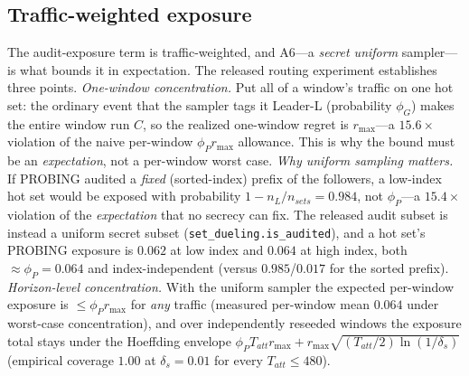 \documentclass{article}
\newcommand{\rmax}{r_{\max}}
\begin{document}
\subsection{Traffic-weighted exposure}\label{sec:eval-floortraffic}
The audit-exposure term is traffic-weighted, and A6---a \emph{secret uniform} sampler---is what
bounds it in expectation. The released routing experiment establishes three
points. \emph{One-window concentration.} Put all of a window's traffic on one
hot set: the ordinary event that the sampler tags it Leader-L (probability $\phi_G$) makes the
entire window run $C$, so the realized one-window regret is $\rmax$---a $15.6\times$ violation of
the naive per-window $\phi_P\rmax$ allowance. This is why the bound must be an \emph{expectation},
not a per-window worst case. \emph{Why uniform sampling matters.} If PROBING audited a \emph{fixed}
(sorted-index) prefix of the followers, a low-index hot set would be exposed with probability
$1-n_L/n_{sets}=0.984$, not $\phi_P$---a $15.4\times$ violation of the \emph{expectation} that no
secrecy can fix. The released audit subset is instead a uniform secret
subset (\texttt{set\_dueling.is\_audited}), and a hot set's PROBING exposure is $0.062$ at low
index and $0.064$ at high index, both $\approx\phi_P{=}0.064$ and index-independent (versus
$0.985$/$0.017$ for the sorted prefix). \emph{Horizon-level concentration.} With the uniform sampler the
expected per-window exposure is $\le\phi_P\rmax$ for \emph{any} traffic (measured per-window mean
$0.064$ under worst-case concentration), and over independently reseeded windows the exposure
total stays under the Hoeffding envelope $\phi_P T_{att}\rmax+\rmax\sqrt{(T_{att}/2)\ln(1/\delta_s)}$
(empirical coverage $1.00$ at $\delta_s{=}0.01$ for every $T_{att}\!\le\!480$).
\end{document}
